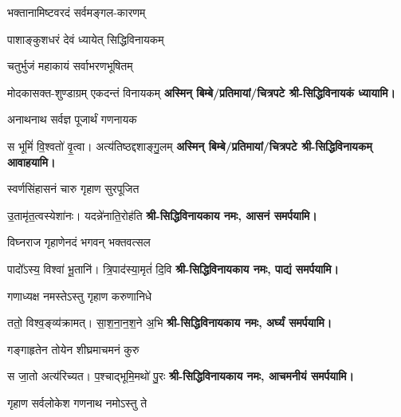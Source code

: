\renewcommand{\devAya}{श्री-सिद्धिविनायकाय नमः,}
\begin{center}

{भक्तानामिष्टवरदं सर्वमङ्गल-कारणम्}

{पाशाङ्कुशधरं देवं ध्यायेत् सिद्धिविनायकम्}

{चतुर्भुजं महाकायं सर्वाभरणभूषितम्}

{मोदकासक्त-शुण्डाग्रम् एकदन्तं विनायकम्}
\textbf{अस्मिन् बिम्बे/प्रतिमायां/चित्रपटे श्री-सिद्धिविनायकं ध्यायामि।}

{अनाथनाथ सर्वज्ञ पूजार्थं गणनायक}

{स भूमिं॑ वि॒श्वतो॑ वृ॒त्वा। अत्य॑तिष्ठद्दशाङ्गु॒लम्}
\textbf{अस्मिन् बिम्बे/प्रतिमायां/चित्रपटे श्री-सिद्धिविनायकम् आवाहयामि।}
\medskip

{स्वर्णसिंहासनं चारु गृहाण सुरपूजित}

{उ॒तामृ॑त॒त्वस्येशा॑नः। यदन्ने॑नाति॒रोह॑ति}
\textbf{\devAya{} आसनं समर्पयामि।}
\medskip

{विघ्नराज गृहाणेनदं भगवन् भक्तवत्सल}

{पादो᳚ऽस्य॒ विश्वा॑ भू॒तानि॑। त्रि॒पाद॑स्या॒मृतं॑ दि॒वि}
\textbf{\devAya{} पाद्यं समर्पयामि।}
\medskip

{गणाध्यक्ष नमस्तेऽस्तु गृहाण करुणानिधे}

{ततो॒ विश्व॒ङ्व्य॑क्रामत्। सा॒श॒ना॒न॒श॒ने अ॒भि}
\textbf{\devAya{} अर्घ्यं समर्पयामि।}
\medskip

{गङ्गाहृतेन तोयेन शीघ्रमाचमनं कुरु}

{स जा॒तो अत्य॑रिच्यत। प॒श्चाद्भूमि॒मथो॑ पु॒रः}
\textbf{\devAya{} आचमनीयं समर्पयामि।}
\medskip

{गृहाण सर्वलोकेश गणनाथ नमोऽस्तु ते}


\end{center}
